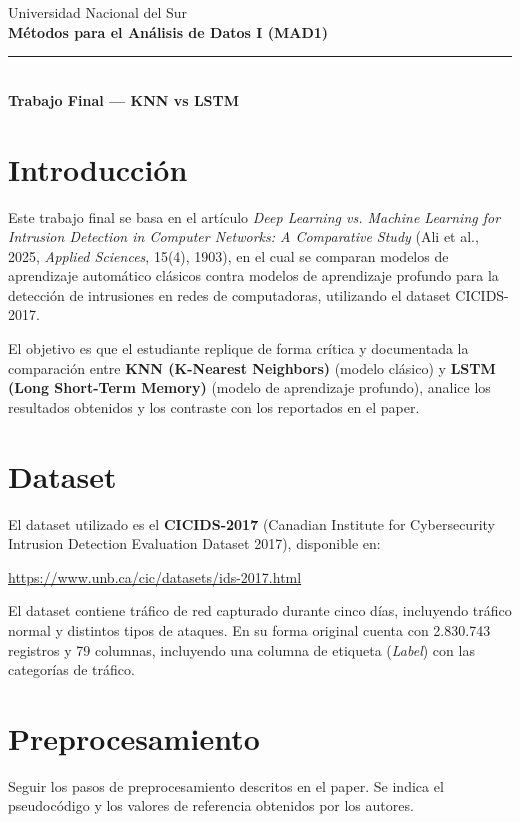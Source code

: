 \documentclass[11pt,a4paper]{article}
\begin{document}
\begin{center}
    {\color{azulUNS}\small Universidad Nacional del Sur}\\[2pt]
    {\color{azulUNS}\Large\bfseries M\'etodos para el An\'alisis de Datos I (MAD1)}\\[6pt]
    {\color{azulUNS}\rule{\textwidth}{1.2pt}}\\[8pt]
    {\Large\bfseries Trabajo Final --- KNN vs LSTM}
\end{center}

\vspace{1em}

\section{Introducci\'on}
Este trabajo final se basa en el art\'iculo \textit{Deep Learning vs. Machine Learning for Intrusion Detection in Computer Networks: A Comparative Study} (Ali et al., 2025, \textit{Applied Sciences}, 15(4), 1903), en el cual se comparan modelos de aprendizaje autom\'atico cl\'asicos contra modelos de aprendizaje profundo para la detecci\'on de intrusiones en redes de computadoras, utilizando el dataset CICIDS-2017.

El objetivo es que el estudiante replique de forma cr\'itica y documentada la comparaci\'on entre \textbf{KNN (K-Nearest Neighbors)} (modelo cl\'asico) y \textbf{LSTM (Long Short-Term Memory)} (modelo de aprendizaje profundo), analice los resultados obtenidos y los contraste con los reportados en el paper.

\section{Dataset}
El dataset utilizado es el \textbf{CICIDS-2017} (Canadian Institute for Cybersecurity Intrusion Detection Evaluation Dataset 2017), disponible en:
\begin{center}
\url{https://www.unb.ca/cic/datasets/ids-2017.html}
\end{center}
El dataset contiene tr\'afico de red capturado durante cinco d\'ias, incluyendo tr\'afico normal y distintos tipos de ataques. En su forma original cuenta con 2.830.743 registros y 79 columnas, incluyendo una columna de etiqueta (\textit{Label}) con las categor\'ias de tr\'afico.

\section{Preprocesamiento}
Seguir los pasos de preprocesamiento descritos en el paper. Se indica el pseudoc\'odigo y los valores de referencia obtenidos por los autores.
\end{document}

